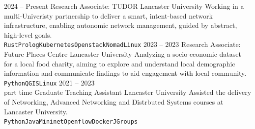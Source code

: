 \documentclass[9pt]{developercv} %
\begin{document}
\begin{entrylist}
	\entry
	{2024 -- Present}
	{Research Associate: TUDOR}
	{Lancaster University}
	{Working in a multi-Univeristy partnership to deliver a smart,
	intent-based network infrastructure, enabling autonomic network management,
	guided by abstract, high-level goals.\\
		\texttt{Rust}\slashsep\texttt{Prolog}\slashsep\texttt{Kubernetes}\slashsep\texttt{Openstack}\slashsep\texttt{Nomad}\slashsep\texttt{Linux}}
	\entry
	{2023 -- 2023}
	{Research Associate: Future Places Centre}
	{Lancaster University}
	{Analyzing a socio-economic dataset for a local food charity, aiming to
	explore and understand local demographic information and communicate
	findings to aid engagement with local community.\\
		\texttt{Python}\slashsep\texttt{QGIS}\slashsep\texttt{Linux}}
	\entry
	{2021 -- 2023\\\footnotesize{part time}}
	{Graduate Teaching Assistant}
	{Lancaster University}
	{Assisted the delivery of Networking, Advanced Networking and Distrbuted
	Systems courses at Lancaster University.\\
		\texttt{Python}\slashsep\texttt{Java}\slashsep\texttt{Mininet}\slashsep\texttt{Openflow}\slashsep\texttt{Docker}\slashsep\texttt{JGroups}}
\end{entrylist}


\vspace{-1em}
\end{document}

